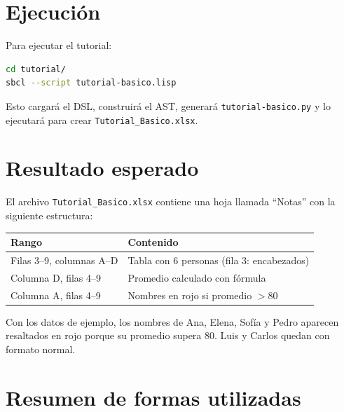 \documentclass[12pt,a4paper]{report}
\begin{document}


\section{Ejecución}

Para ejecutar el tutorial:

\begin{lstlisting}[language=bash, numbers=none, backgroundcolor=\color{gray!10},
                   basicstyle=\ttfamily\small]
cd tutorial/
sbcl --script tutorial-basico.lisp
\end{lstlisting}

Esto cargará el DSL, construirá el AST, generará
\texttt{tutorial-basico.py} y lo ejecutará para crear
\texttt{Tutorial\_Basico.xlsx}.

\section{Resultado esperado}

El archivo \texttt{Tutorial\_Basico.xlsx} contiene una hoja llamada
``Notas'' con la siguiente estructura:

\begin{center}
\begin{tabular}{ll}
\toprule
\textbf{Rango} & \textbf{Contenido} \\
\midrule
Filas 3--9, columnas A--D & Tabla con 6 personas (fila 3: encabezados) \\
Columna D, filas 4--9     & Promedio calculado con fórmula \\
Columna A, filas 4--9     & Nombres en rojo si promedio $> 80$ \\
\bottomrule
\end{tabular}
\end{center}

Con los datos de ejemplo, los nombres de Ana, Elena, Sofía y Pedro
aparecen resaltados en rojo porque su promedio supera 80.  Luis y Carlos
quedan con formato normal.

\section{Resumen de formas utilizadas}
\end{document}
